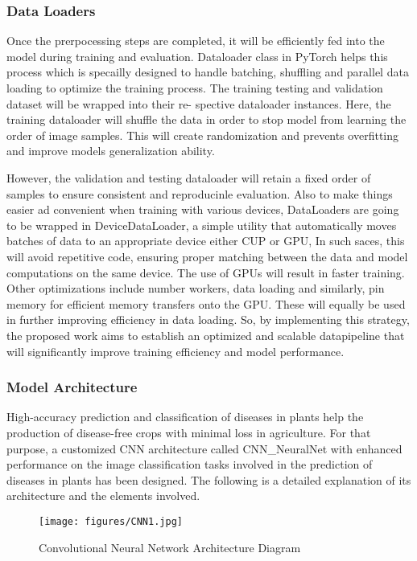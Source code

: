 \subsubsection{Data Loaders}
Once the prerpocessing steps are completed, it will be efficiently fed into the model
during training and evaluation. Dataloader class in PyTorch helps this process which is
specailly designed to handle batching, shuffling and parallel data loading to optimize the
training process. The training testing and validation dataset will be wrapped into their re-
spective dataloader instances. Here, the training dataloader will shuffle the data in order
to stop model from learning the order of image samples. This will create randomization
and prevents overfitting and improve models generalization ability.


However, the validation and testing dataloader will retain a fixed order of samples to ensure consistent and
reproducinle evaluation. Also to make things easier ad convenient when training with
various devices, DataLoaders are going to be wrapped in DeviceDataLoader, a simple
utility that automatically moves batches of data to an appropriate device either CUP or
GPU, In such saces, this will avoid repetitive code, ensuring proper matching between
the data and model computations on the same device. The use of GPUs will result in
faster training. Other optimizations include number workers, data loading and similarly, 
pin memory for efficient memory transfers onto the GPU. These will equally be used in 
further improving efficiency in data loading. So, by implementing this strategy, the proposed work aims to 
establish an optimized and scalable datapipeline that will significantly improve training efficiency and
model performance.

\clearpage
\subsubsection{Model Architecture}

High-accuracy prediction and classification of diseases in plants help the production of disease-free crops with minimal loss 
in agriculture. For that purpose, a customized CNN architecture called CNN\_NeuralNet 
with enhanced performance on the image classification tasks involved in the prediction of diseases in plants has been designed.
The following is a detailed explanation of its architecture and the elements involved. 

\begin{figure}[h]
    \centering
    \texttt{[image: figures/CNN1.jpg]}
    \captionsetup{labelsep=colon, justification=centering, labelfont=bf}
    \caption{Convolutional Neural Network Architecture Diagram}
\end{figure}




